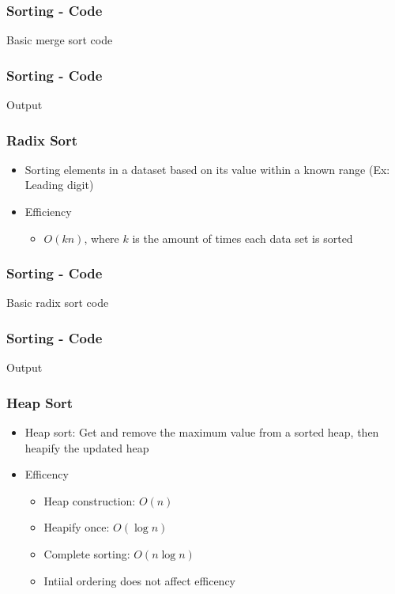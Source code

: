 \begin{frame}\frametitle{Sorting - Code}
Basic merge sort code

\end{frame}

\begin{frame}\frametitle{Sorting - Code}
Output

\end{frame}

\begin{frame}\frametitle{Radix Sort}
\begin{itemize}
\item Sorting elements in a dataset based on its value within a known range (Ex: Leading digit)
\item Efficiency
	\begin{itemize}
	\item $O(kn)$, where $k$ is the amount of times each data set is sorted
	\end{itemize}
\end{itemize}
\end{frame}

\begin{frame}\frametitle{Sorting - Code}
Basic radix sort code

\end{frame}

\begin{frame}\frametitle{Sorting - Code}
Output

\end{frame}

\begin{frame}\frametitle{Heap Sort}
\begin{itemize}
\item Heap sort: Get and remove the maximum value from a sorted heap, then heapify the updated heap
\item Efficency
	\begin{itemize}
	\item Heap construction: $O(n)$
	\item Heapify once: $O(\log n)$
	\item Complete sorting: $O(n \log n)$
	\item Intiial ordering does not affect efficency
	\end{itemize}
\end{itemize}
\end{frame}

%

